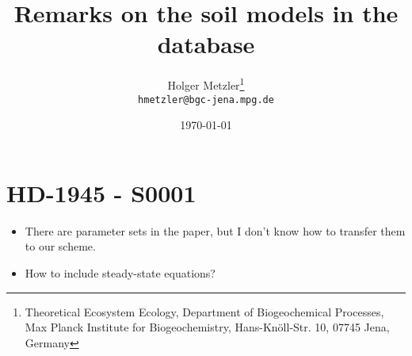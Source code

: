 \documentclass[american, 12pt]{article}
\newcommand{\red}[1]{{\color{red}#1}}
\begin{document}
\title{Remarks on the soil models in the database}
\author{Holger Metzler\footnote{Theoretical Ecosystem Ecology, Department of Biogeochemical Processes, Max Planck Institute for Biogeochemistry, Hans-Kn\"oll-Str. 10, 07745 Jena, Germany}\\{\footnotesize \texttt{hmetzler@bgc-jena.mpg.de}}}
\date{\today}
\maketitle

\section{HD-1945 - S0001}
\citep{Henin1945Annalesagronomiques}
\begin{itemize}
  \item \red{There are parameter sets in the paper, but I don't know how to transfer them to our scheme.}
  \item \red{How to include steady-state equations?}
\end{itemize}
\end{document}
